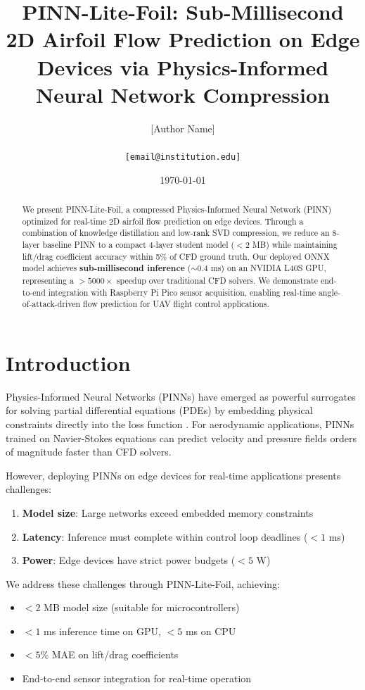 \documentclass[11pt,letterpaper]{article}
\title{\textbf{PINN-Lite-Foil: Sub-Millisecond 2D Airfoil Flow Prediction on Edge Devices via Physics-Informed Neural Network Compression}}
\author{
    [Author Name]\\
    [Institution]\\
    \texttt{[email@institution.edu]}
}
\date{\today}
\begin{document}
\maketitle

\begin{abstract}
We present PINN-Lite-Foil, a compressed Physics-Informed Neural Network (PINN) optimized for real-time 2D airfoil flow prediction on edge devices. Through a combination of knowledge distillation and low-rank SVD compression, we reduce an 8-layer baseline PINN to a compact 4-layer student model ($<2$ MB) while maintaining lift/drag coefficient accuracy within 5\% of CFD ground truth. Our deployed ONNX model achieves \textbf{sub-millisecond inference} ($\sim$0.4 ms) on an NVIDIA L40S GPU, representing a $>5000\times$ speedup over traditional CFD solvers. We demonstrate end-to-end integration with Raspberry Pi Pico sensor acquisition, enabling real-time angle-of-attack-driven flow prediction for UAV flight control applications.
\end{abstract}

\section{Introduction}

Physics-Informed Neural Networks (PINNs) have emerged as powerful surrogates for solving partial differential equations (PDEs) by embedding physical constraints directly into the loss function \cite{raissi2019physics}. For aerodynamic applications, PINNs trained on Navier-Stokes equations can predict velocity and pressure fields orders of magnitude faster than CFD solvers.

However, deploying PINNs on edge devices for real-time applications presents challenges:
\begin{enumerate}
    \item \textbf{Model size}: Large networks exceed embedded memory constraints
    \item \textbf{Latency}: Inference must complete within control loop deadlines ($<1$ ms)
    \item \textbf{Power}: Edge devices have strict power budgets ($<5$ W)
\end{enumerate}

We address these challenges through PINN-Lite-Foil, achieving:
\begin{itemize}
    \item $<2$ MB model size (suitable for microcontrollers)
    \item $<1$ ms inference time on GPU, $<5$ ms on CPU
    \item $<5\%$ MAE on lift/drag coefficients
    \item End-to-end sensor integration for real-time operation
\end{itemize}
\end{document}
